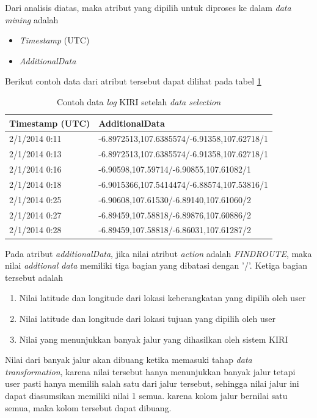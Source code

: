 Dari analisis diatas, maka atribut yang dipilih untuk diproses ke dalam \textsl{data mining} adalah
\begin{itemize}
	\item \textsl{Timestamp} (UTC)
	\item \textsl{AdditionalData}
\end{itemize}

Berikut contoh data dari atribut tersebut dapat dilihat pada tabel \ref{table:contohDataLog}
\begin{table}[h]
\caption{Contoh data \textsl{log} KIRI setelah \textsl{data selection}}
\label{table:contohDataLog}
\begin{tabular}{|l|l|}
\hline
\textbf{Timestamp (UTC)} & \textbf{AdditionalData}                     \\ \hline
2/1/2014 0:11            & -6.8972513,107.6385574/-6.91358,107.62718/1 \\ \hline
2/1/2014 0:13            & -6.8972513,107.6385574/-6.91358,107.62718/1 \\ \hline
2/1/2014 0:16            & -6.90598,107.59714/-6.90855,107.61082/1     \\ \hline
2/1/2014 0:18            & -6.9015366,107.5414474/-6.88574,107.53816/1 \\ \hline
2/1/2014 0:25            & -6.90608,107.61530/-6.89140,107.61060/2     \\ \hline
2/1/2014 0:27            & -6.89459,107.58818/-6.89876,107.60886/2     \\ \hline
2/1/2014 0:28            & -6.89459,107.58818/-6.86031,107.61287/2     \\ \hline
\end{tabular}
\end{table}

Pada atribut \textsl{additionalData}, jika nilai atribut \textsl{action} adalah \textsl{FINDROUTE}, maka nilai \textsl{addtional data} memiliki tiga bagian yang dibatasi dengan '/'. Ketiga bagian tersebut adalah

\begin{enumerate}
	\item Nilai latitude dan longitude dari lokasi keberangkatan yang dipilih oleh user
	\item Nilai latitude dan longitude dari lokasi tujuan yang dipilih oleh user
	\item Nilai yang menunjukkan banyak jalur yang dihasilkan oleh sistem KIRI
\end{enumerate}

Nilai dari banyak jalur akan dibuang ketika memasuki tahap \textsl{data transformation}, karena nilai tersebut hanya menunjukkan banyak jalur tetapi user pasti hanya memilih salah satu dari jalur tersebut, sehingga nilai jalur ini dapat diasumsikan memiliki nilai 1 semua. karena kolom jalur bernilai satu semua, maka kolom tersebut dapat dibuang.

